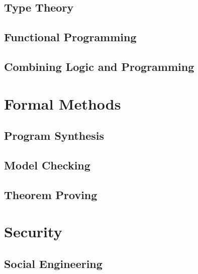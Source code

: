 \documentclass{book}
\begin{document}
   
  \chapter{Type Theory}\label{sec:sd:typetheory}

  \chapter{Functional Programming}

  \chapter{Combining Logic and Programming}

\part{Formal Methods}

  \chapter{Program Synthesis} %

  \chapter{Model Checking} %
    

  \chapter{Theorem Proving} %
   

\part{Security}

  \chapter{Social Engineering}
\end{document}
